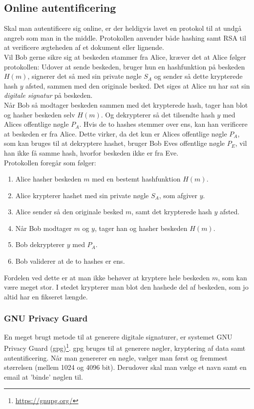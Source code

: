 \subsection{Online autentificering}
Skal man autentificere sig online, er der heldigvis lavet en protokol til at undgå angreb som man in the middle.\cite{dtu}
Protokollen anvender både hashing samt RSA til at verificere ægteheden af et dokument eller lignende.\\
Vil Bob gerne sikre sig at beskeden stammer fra Alice, kræver det at Alice følger protokollen:
Udover at sende beskeden, bruger hun en hashfunktion på beskeden \(H(m)\), signerer det så med sin private nøgle \(S_A\) og sender så dette krypterede hash \(y\) afsted, sammen med den originale besked.
Det siges at Alice nu har sat sin \emph{digitale signatur} på beskeden.\\
Når Bob så modtager beskeden sammen med det krypterede hash, tager han blot og hasher beskeden selv \(H(m)\).
Og dekrypterer så det tilsendte hash \(y\) med Alices offentlige nøgle \(P_A\).
Hvis de to hashes stemmer over ens, kan han verificere at beskeden er fra Alice.
Dette virker, da det kun er Alices offentlige nøgle \(P_A\), som kan bruges til at dekryptere hashet, bruger Bob Eves offentlige nøgle \(P_E\), vil han ikke få samme hash, hvorfor beskeden ikke er fra Eve.\\

Protokollen foregår som følger:
\begin{enumerate}[noitemsep]
    \item Alice hasher beskeden \(m\) med en bestemt hashfunktion \(H(m)\).
    \item Alice krypterer hashet med sin private nøgle \(S_A\), som afgiver \(y\).
    \item Alice sender så den originale besked \(m\), samt det krypterede hash \(y\) afsted.
    \item Når Bob modtager \(m\) og \(y\), tager han og hasher beskeden \(H(m)\).
    \item Bob dekrypterer \(y\) med \(P_A\).
    \item Bob validerer at de to hashes er ens.
\end{enumerate}

Fordelen ved dette er at man ikke behøver at kryptere hele beskeden \(m\), som kan være meget stor. I stedet krypterer man blot den hashede del af beskeden, som jo altid har en fikseret længde.


    \subsubsection{GNU Privacy Guard}
    En meget brugt metode til at generere digitale signaturer, er systemet GNU Privacy Guard (gpg)\footnote{\url{https://gnupg.org/}}.
    gpg bruges til at generere nøgler, kryptering af data samt autentificering.
    Når man genererer en nøgle, vælger man først og fremmest størrelsen (mellem 1024 og 4096 bit).
    Derudover skal man vælge et navn samt en email at 'binde' nøglen til.\\




